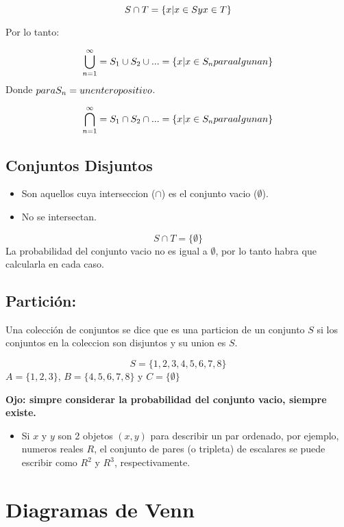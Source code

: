 \documentclass[]{book}
\providecommand{\tightlist}{%
  \setlength{\itemsep}{0pt}\setlength{\parskip}{0pt}}
\begin{document}
\[S \cap T = \{x|x \in S\space y \space x \in T \} \]

 Por lo tanto:

\[\bigcup_{n=1}^{\infty}= S_1 \cup S_2 \cup ...= \{ x|x \in S_n para \space alguna\space n\} \]
Donde \(para\space S_n = \space un \space entero \space positivo\).

\[ \bigcap_{n=1}^{\infty} = S_1 \cap S_2 \cap ... = \{ x|x \in S_n \space para \space alguna \space n\}\]

\subsection{Conjuntos Disjuntos}\label{conjuntos-disjuntos-2}

\begin{itemize}
\tightlist
\item
  Son aquellos cuya interseccion (\(\cap\)) es el conjunto vacio
  (\(\emptyset\)).
\item
  No se intersectan.
\end{itemize}

\[S \cap T = \{ \emptyset\}\] La probabilidad del conjunto vacio no es
igual a \(\emptyset\), por lo tanto habra que calcularla en cada caso.

\subsection{Partición:}\label{particion-2}

Una colección de conjuntos se dice que es una particion de un conjunto
\(S\) si los conjuntos en la coleccion son disjuntos y su union es
\(S\).

\[S = \{1,2,3,4,5,6,7,8\}\] \(A = \{1,2,3\}\), \(B = \{4,5,6,7,8\}\) y
\(C = \{\emptyset\}\)

 \textbf{Ojo: simpre considerar la probabilidad del conjunto vacio,
siempre existe.}

\begin{itemize}
\tightlist
\item
  Si \(x\) y \(y\) son 2 objetos \((x,y)\) para describir un par
  ordenado, por ejemplo, numeros reales \(R\), el conjunto de pares (o
  tripleta) de escalares se puede escribir como \(R^2\) y \(R^3\),
  respectivamente.
\end{itemize}

\section{\texorpdfstring{\textbf{Diagramas de
Venn}}{Diagramas de Venn}}\label{diagramas-de-venn-2}
\end{document}
